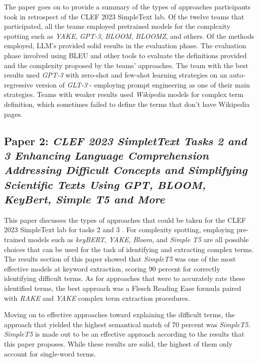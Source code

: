 \documentclass[runningheads]{llncs}
\begin{document}
The paper goes on to provide a summary of the types of approaches participants took in retrospect of the CLEF 2023 SimpleText lab. Of the twelve teams that participated, all the teams employed pretrained models for the complexity spotting such as \textit{YAKE}, \textit{GPT-3}, \textit{BLOOM}, \textit{BLOOMZ}, and others. Of the methods employed, LLM’s provided solid results in the evaluation phase. The evaluation phase involved using BLEU and other tools to evaluate the definitions provided and the complexity proposed by the teams’ approaches. The team with the best results used \textit{GPT-3} with zero-shot and few-shot learning strategies on an auto-regressive version of \textit{GLT-3} - employing prompt engineering as one of their main strategies. Teams with weaker results used \textit{Wikipedia} models for complex term definition, which sometimes failed to define the terms that don’t have Wikipedia pages.

\subsection{Paper 2: \textit{CLEF 2023 SimpletText Tasks 2 and 3 Enhancing Language Comprehension Addressing Difficult Concepts and Simplifying Scientific Texts Using \textit{GPT}, \textit{BLOOM}, \textit{KeyBert}, \textit{Simple T5} and More}}
This paper discusses the types of approaches that could be taken for the CLEF 2023 SimpleText lab for tasks 2 and 3 \cite{Paper 2}. For complexity spotting, employing pre-trained models such as \textit{keyBERT}, \textit{YAKE}, \textit{Bloom}, and \textit{Simple T5} are all possible choices that can be used for the task of identifying and extracting complex terms. The results section of this paper showed that \textit{SimpleT5} was one of the most effective models at keyword extraction, scoring 90 percent for correctly identifying difficult terms. As for approaches that were to accurately rate these identified terms, the best approach was a Flesch Reading Ease formula paired with \textit{RAKE} and \textit{YAKE} complex term extraction procedures. 

Moving on to effective approaches toward explaining the difficult terms, the approach that yielded the highest semantical match of 70 percent was \textit{SimpleT5}. \textit{SimpleT5} is made out to be an effective approach according to the results that this paper proposes. While these results are solid, the highest of them only account for single-word terms.
\end{document}
